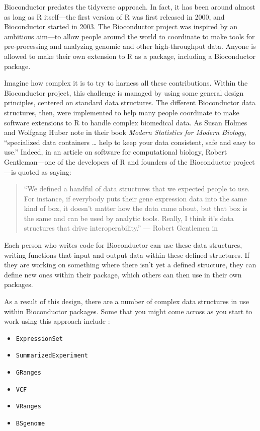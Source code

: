 \documentclass[]{tufte-book}
\providecommand{\tightlist}{%
  \setlength{\itemsep}{0pt}\setlength{\parskip}{0pt}}
\begin{document}
Bioconductor predates the tidyverse approach. In fact, it has been around almost
as long as R itself---the first version of R was first released in 2000, and
Bioconductor started in 2003. The Bioconductor project was inspired by an
ambitious aim---to allow people around the world to coordinate to make tools for
pre-processing and analyzing genomic and other high-throughput data. Anyone is
allowed to make their own extension to R as a package, including a Bioconductor
package.

Imagine how complex it is to try to harness all these contributions. Within the
Bioconductor project, this challenge is managed by using some general design
principles, centered on standard data structures. The different Bioconductor
data structures, then, were implemented to help many people coordinate to make
software extensions to R to handle complex biomedical data. As Susan Holmes and
Wolfgang Huber note in their book \emph{Modern Statistics for Modern Biology},
``specialized data containers \ldots{} help to keep your data consistent, safe and
easy to use.'' \citep{holmes2018modern} Indeed, in an article on software for
computational biology, Robert Gentleman---one of the developers of R and
founders of the Bioconductor project---is quoted as saying:

\begin{quote}
``We defined a handful of data structures that we expected people to use. For
instance, if everybody puts their gene expression data into the same kind of
box, it doesn't matter how the data came about, but that box is the same and can
be used by analytic tools. Really, I think it's data structures that drive
interoperability.'' --- Robert Gentlemen in \citep{altschul2013anatomy}
\end{quote}

Each person who writes code for Bioconductor can use these data structures,
writing functions that input and output data within these defined structures. If
they are working on something where there isn't yet a defined structure, they
can define new ones within their package, which others can then use in their own
packages.

As a result of this design, there are a number of complex data structures in
use within Bioconductor packages. Some that you might come across as you start to work
using this approach include \citep{huber2015orchestrating}:

\begin{itemize}
\tightlist
\item
  \texttt{ExpressionSet}
\item
  \texttt{SummarizedExperiment}
\item
  \texttt{GRanges}
\item
  \texttt{VCF}
\item
  \texttt{VRanges}
\item
  \texttt{BSgenome}
\end{itemize}
\end{document}
